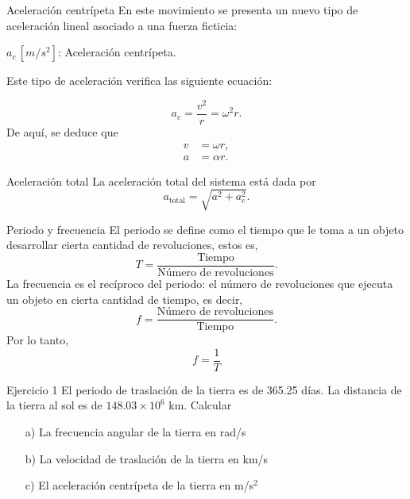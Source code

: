 \begin{frame}{Aceleración centrípeta}
    En este movimiento se presenta un nuevo tipo de aceleración lineal asociado a una fuerza ficticia:
    \begin{center}
        $a_c\,[\unit{m}/\unit{s}^2]$: Aceleración centrípeta.
    \end{center}
    Este tipo de aceleración verifica las siguiente ecuación:

    \begin{equation}
        a_c=\frac{v^2}{r}=\omega^2r.
    \end{equation}
    De aquí, se deduce que \begin{align}
        v&=\omega r,\\
        a&=\alpha r.
    \end{align}
    
\end{frame}

\begin{frame}{Aceleración total}
    La aceleración total del sistema está dada por
    \begin{equation}
        a_{\text{total}}=\sqrt{a^2+a_c^2}.
    \end{equation}
\end{frame}

\begin{frame}{Periodo y frecuencia}
    El periodo se define como el tiempo que le toma a un objeto desarrollar cierta cantidad de revoluciones, estos es, \begin{equation}
        T=\frac{\text{Tiempo}}{\text{Número de revoluciones}}.
    \end{equation} La frecuencia es el recíproco del periodo: el número de revoluciones que ejecuta un objeto en cierta cantidad de tiempo, es decir, \begin{equation}
        f=\frac{\text{Número de revoluciones}}{\text{Tiempo}}.
    \end{equation} Por lo tanto, \begin{equation}
        f=\frac{1}{T}
    \end{equation}
\end{frame}

\begin{frame}{Ejercicio 1}
    El periodo de traslación de la tierra es de 365.25 días. La distancia de la tierra al sol es de $148.03\times 10^6$ km. Calcular
	    \begin{itemize}
	        \item[a)] La frecuencia angular de la tierra en rad/s
	        \item[b)] La velocidad de traslación de la tierra en km/s
	        \item[c)] El aceleración centrípeta de la tierra en m/s$^2$
	\end{itemize}
\end{frame}

